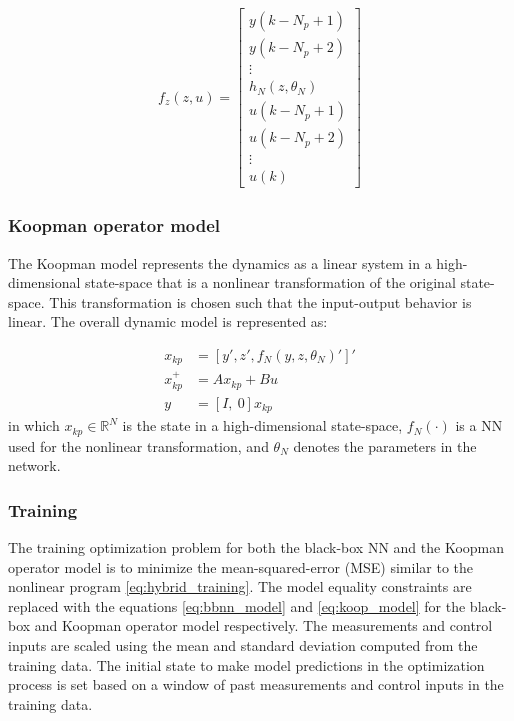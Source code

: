 \documentclass[10pt]{article}
\newcommand{\bbR}{\mathbb{R}} \newcommand{\bbW}{\mathbb{W}}
\begin{document}
\begin{align*}
  f_z(z, u) = \begin{bmatrix}
    y(k-N_p+1) \\
    y(k-N_p+2) \\
    \vdots \\
    h_N(z, \theta_N) \\
    u(k-N_p+1) \\ 
    u(k-N_p+2) \\
    \vdots \\
    u(k)
  \end{bmatrix}
\end{align*}

\subsubsection{Koopman operator model}

The Koopman model represents the dynamics as a linear system in a high-dimensional state-space that is a nonlinear transformation of the original state-space. This transformation is chosen such that the input-output behavior is linear. The overall dynamic model is represented as:

\begin{align} \label{eq:koop_model}
  x_{kp} &= [y', z', f_N(y, z, \theta_N)']' \\
  x_{kp}^+ &= Ax_{kp} + Bu \nonumber \\
  y &= [I, \ 0] x_{kp} \nonumber
\end{align}
in which $x_{kp} \in \bbR^N$ is the state in a high-dimensional state-space, $f_N(\cdot)$ is a NN used for the nonlinear transformation, and $\theta_N$ denotes the parameters in the network.

\subsubsection{Training}
The training optimization problem for both the black-box NN and the Koopman operator model is to minimize the mean-squared-error (MSE) similar to the nonlinear program \eqref{eq:hybrid_training}. The model equality constraints are replaced with the equations \eqref{eq:bbnn_model} and \eqref{eq:koop_model} for the black-box and Koopman operator model respectively. The measurements and control inputs are scaled using the mean and standard deviation computed from the training data. The initial state to make model predictions in the optimization process is set based on a window of past measurements and control inputs in the training data.
\end{document}

